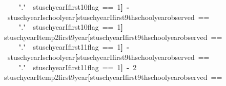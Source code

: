 \documentclass[12pt]{article}
\makeatletter
\newcommand{\hlnumber}[1]{\textcolor[rgb]{0,0,0}{#1}}%
\newcommand{\hlstring}[1]{\textcolor[rgb]{0.6,0.6,1}{#1}}%
\newcommand{\hlkeyword}[1]{\textcolor[rgb]{0,0,0}{\textbf{#1}}}%
\newcommand{\hlassignement}[1]{\textcolor[rgb]{0,0,0}{\textbf{#1}}}%
\newcommand{\hlsymbol}[1]{\textcolor[rgb]{0,0,0}{#1}}%
\newcommand{\hlstd}[1]{\textcolor[rgb]{0,0,0}{#1}}%
\newenvironment{kframe}{%
 \def\FrameCommand##1{\hskip\@totalleftmargin \hskip-\fboxsep
 \colorbox{shadecolor}{##1}\hskip-\fboxsep
     \hskip-\linewidth \hskip-\@totalleftmargin \hskip\columnwidth}%
 \MakeFramed {\advance\hsize-\width
   \@totalleftmargin\z@ \linewidth\hsize
   \@setminipage}}%
 {\par\unskip\endMakeFramed}
\newenvironment{knitrout}{}{} %
\renewenvironment{knitrout}{\begin{footnotesize}}{\end{footnotesize}}
\makeatother
\begin{document}
\begin{knitrout}
\begin{kframe}
\begin{flushleft}
\hlstd{}{\ }{\ }{\ }{\ }\hlstring{"{}."{}}{\ }\hlkeyword{\usebox{\hlnormalsizeboxand}}{\ }\hlsymbol{stuschyearI}\hlkeyword{\usebox{\hlnormalsizeboxdollar}}\hlsymbol{first10\usebox{\hlnormalsizeboxunderscore}flag}{\ }=={\ }\hlnumber{1}\hlkeyword{]}{\ }\hlassignement{\usebox{\hlnormalsizeboxlessthan}-}{\ }\hlsymbol{stuschyearI}\hlkeyword{\usebox{\hlnormalsizeboxdollar}}\hlsymbol{school\usebox{\hlnormalsizeboxunderscore}year}\hlkeyword{[}\hlsymbol{stuschyearI}\hlkeyword{\usebox{\hlnormalsizeboxdollar}}\hlsymbol{first9thschoolyear\usebox{\hlnormalsizeboxunderscore}observed}{\ }==\hspace*{\fill}\\
\hlstd{}{\ }{\ }{\ }{\ }\hlstring{"{}."{}}{\ }\hlkeyword{\usebox{\hlnormalsizeboxand}}{\ }\hlsymbol{stuschyearI}\hlkeyword{\usebox{\hlnormalsizeboxdollar}}\hlsymbol{first10\usebox{\hlnormalsizeboxunderscore}flag}{\ }=={\ }\hlnumber{1}\hlkeyword{]}\hspace*{\fill}\\
\hlstd{}\hlsymbol{stuschyearI}\hlkeyword{\usebox{\hlnormalsizeboxdollar}}\hlsymbol{temp2\usebox{\hlnormalsizeboxunderscore}first9year}\hlkeyword{[}\hlsymbol{stuschyearI}\hlkeyword{\usebox{\hlnormalsizeboxdollar}}\hlsymbol{first9thschoolyear\usebox{\hlnormalsizeboxunderscore}observed}{\ }==\hspace*{\fill}\\
\hlstd{}{\ }{\ }{\ }{\ }\hlstring{"{}."{}}{\ }\hlkeyword{\usebox{\hlnormalsizeboxand}}{\ }\hlsymbol{stuschyearI}\hlkeyword{\usebox{\hlnormalsizeboxdollar}}\hlsymbol{first11\usebox{\hlnormalsizeboxunderscore}flag}{\ }=={\ }\hlnumber{1}\hlkeyword{]}{\ }\hlassignement{\usebox{\hlnormalsizeboxlessthan}-}{\ }\hlsymbol{stuschyearI}\hlkeyword{\usebox{\hlnormalsizeboxdollar}}\hlsymbol{school\usebox{\hlnormalsizeboxunderscore}year}\hlkeyword{[}\hlsymbol{stuschyearI}\hlkeyword{\usebox{\hlnormalsizeboxdollar}}\hlsymbol{first9thschoolyear\usebox{\hlnormalsizeboxunderscore}observed}{\ }==\hspace*{\fill}\\
\hlstd{}{\ }{\ }{\ }{\ }\hlstring{"{}."{}}{\ }\hlkeyword{\usebox{\hlnormalsizeboxand}}{\ }\hlsymbol{stuschyearI}\hlkeyword{\usebox{\hlnormalsizeboxdollar}}\hlsymbol{first11\usebox{\hlnormalsizeboxunderscore}flag}{\ }=={\ }\hlnumber{1}\hlkeyword{]}{\ }\hlkeyword{-}{\ }\hlnumber{2}\hspace*{\fill}\\
\hlstd{}\hlsymbol{stuschyearI}\hlkeyword{\usebox{\hlnormalsizeboxdollar}}\hlsymbol{temp2\usebox{\hlnormalsizeboxunderscore}first9year}\hlkeyword{[}\hlsymbol{stuschyearI}\hlkeyword{\usebox{\hlnormalsizeboxdollar}}\hlsymbol{first9thschoolyear\usebox{\hlnormalsizeboxunderscore}observed}{\ }==\hspace*{\fill}\\

\end{flushleft}
\end{kframe}
\end{knitrout}
\end{document}
